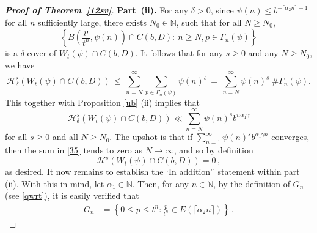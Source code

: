 \documentclass[12pt]{article}
\theoremstyle{definition}
\theoremstyle{remark}
\begin{document}
\begin{proof}[\rm \textbf{Proof of Theorem~\ref{12sv}}]
\bigskip 




\noindent \textbf{Part~(ii).} For any $\delta>0$, since $\psi(n)\leq b^{-\lceil \alpha_{2}n\rceil-1}$ for all $n$ sufficiently  large, there exists $N_{0}\in\mathbb{N}$, such that for all $N\geq N_{0}$,
$$\left\{
 B\left(\frac{p}{t^{n}},\psi(n)\right)\cap C(b,D): \ n\geq N,p\in\Gamma_{n}(\psi)\right\}$$
is a $\delta$-cover of $W_{t}(\psi)\cap C(b,D)$. It follows that for any $s\geq0$ and any $N\geq N_{0}$, we have 
\begin{equation*}
\mathcal{H}_{\delta}^{s}(W_{t}(\psi)\cap C(b,D))  \, \leq   \, \sum_{n=N}^{\infty}\sum_{p\in\Gamma_{n}(\psi)} \psi(n) ^{s}  \, =   \, \sum_{n=N}^{\infty} \psi(n) ^{s}   \ \#\Gamma_{n}(\psi).
\end{equation*}
This together with Proposition \ref{ub} (ii) implies  that
\begin{equation}\label{35}
\mathcal{H}_{\delta}^{s}(W_{t}(\psi)\cap C(b,D))\ll\sum_{n=N}^{\infty}\psi(n)^{s}b^{n\alpha_{1}\gamma}
\end{equation}
for all $s\geq0$ and all $N\geq N_{0}$.  The upshot is  that if  $\sum_{n=1}^{\infty}\psi(n)^{s}b^{\alpha_{1}\gamma n} $ converges,  then the sum in \eqref{35} tends to zero as $N \to \infty$, and so by definition
$$\mathcal{H}^{s}(W_{t}(\psi)\cap C(b,D))=0   \, , $$
as desired.    It now remains to establish the `In addition'' statement  within part (ii). 
With this in mind, let $\alpha_1 \in\mathbb{N}$. Then, for any $n \in\mathbb{N}$, by the definition of $G_{n}$ (see \eqref{qwrt}), it is easily verified that 
\begin{equation*}
\begin{aligned}
G_{n}
&=\left\{0\le p\le t^{n}:\frac{p}{t^{n}}\in E(\lceil\alpha_{2} n\rceil) \right\}  \, . 
\end{aligned}
\end{equation*}

\end{proof}
\end{document}
